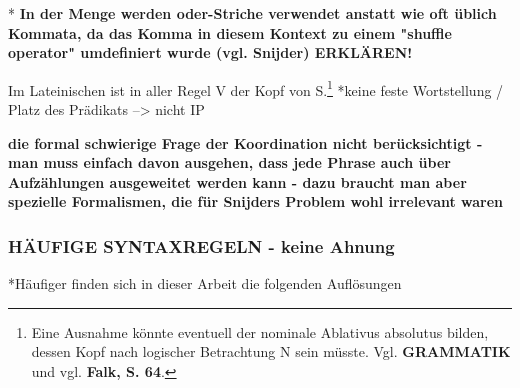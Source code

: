 \documentclass[12pt,a4paper]{article}
\begin{document}
* \textbf{In der Menge werden oder-Striche verwendet anstatt wie oft üblich Kommata, da das Komma in diesem Kontext zu einem "shuffle operator" umdefiniert wurde (vgl. Snijder) ERKLÄREN!}

Im Lateinischen ist in aller Regel V der Kopf von S.\footnote{Eine Ausnahme könnte eventuell der nominale Ablativus absolutus bilden, dessen Kopf nach logischer Betrachtung N sein müsste. Vgl. \textbf{GRAMMATIK} und vgl. \textbf{Falk, S. 64}.}
*keine feste Wortstellung / Platz des Prädikats --> nicht IP

\textbf{die formal schwierige Frage der Koordination nicht berücksichtigt - man muss einfach davon ausgehen, dass jede Phrase auch über Aufzählungen ausgeweitet werden
kann - dazu braucht man aber spezielle Formalismen, die für Snijders
Problem wohl irrelevant waren}


\subsubsection{HÄUFIGE SYNTAXREGELN - keine Ahnung}
*Häufiger finden sich in dieser Arbeit die folgenden Auflösungen
\end{document}
